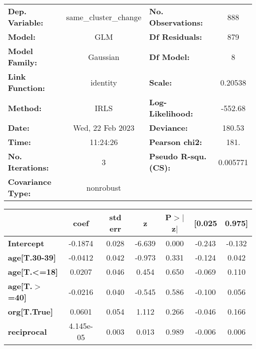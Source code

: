 \begin{center}
\begin{tabular}{lclc}
\toprule
\textbf{Dep. Variable:}   & same\_cluster\_change & \textbf{  No. Observations:  } &      888    \\
\textbf{Model:}           &          GLM          & \textbf{  Df Residuals:      } &      879    \\
\textbf{Model Family:}    &        Gaussian       & \textbf{  Df Model:          } &        8    \\
\textbf{Link Function:}   &        identity       & \textbf{  Scale:             } &   0.20538   \\
\textbf{Method:}          &          IRLS         & \textbf{  Log-Likelihood:    } &   -552.68   \\
\textbf{Date:}            &    Wed, 22 Feb 2023   & \textbf{  Deviance:          } &    180.53   \\
\textbf{Time:}            &        11:24:26       & \textbf{  Pearson chi2:      } &     181.    \\
\textbf{No. Iterations:}  &           3           & \textbf{  Pseudo R-squ. (CS):} &  0.005771   \\
\textbf{Covariance Type:} &       nonrobust       & \textbf{                     } &             \\
\bottomrule
\end{tabular}
\begin{tabular}{lcccccc}
                        & \textbf{coef} & \textbf{std err} & \textbf{z} & \textbf{P$> |$z$|$} & \textbf{[0.025} & \textbf{0.975]}  \\
\midrule
\textbf{Intercept}      &      -0.1874  &        0.028     &    -6.639  &         0.000        &       -0.243    &       -0.132     \\
\textbf{age[T.30-39]}   &      -0.0412  &        0.042     &    -0.973  &         0.331        &       -0.124    &        0.042     \\
\textbf{age[T.<=18]}    &       0.0207  &        0.046     &     0.454  &         0.650        &       -0.069    &        0.110     \\
\textbf{age[T.$>$=40]}  &      -0.0216  &        0.040     &    -0.545  &         0.586        &       -0.100    &        0.056     \\
\textbf{org[T.True]}    &       0.0601  &        0.054     &     1.112  &         0.266        &       -0.046    &        0.166     \\
\textbf{reciprocal}     &    4.145e-05  &        0.003     &     0.013  &         0.989        &       -0.006    &        0.006     \\

\end{tabular}
\end{center}
